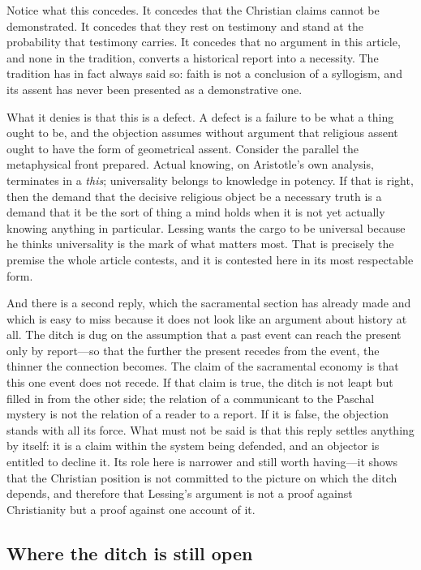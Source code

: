 Notice what this concedes. It concedes that the Christian claims cannot be demonstrated. It concedes that they rest on testimony and stand at the probability that testimony carries. It concedes that no argument in this article, and none in the tradition, converts a historical report into a necessity. The tradition has in fact always said so: faith is not a conclusion of a syllogism, and its assent has never been presented as a demonstrative one.

What it denies is that this is a defect. A defect is a failure to be what a thing ought to be, and the objection assumes without argument that religious assent ought to have the form of geometrical assent. Consider the parallel the metaphysical front prepared. Actual knowing, on Aristotle's own analysis, terminates in a \emph{this}; universality belongs to knowledge in potency. If that is right, then the demand that the decisive religious object be a necessary truth is a demand that it be the sort of thing a mind holds when it is not yet actually knowing anything in particular. Lessing wants the cargo to be universal because he thinks universality is the mark of what matters most. That is precisely the premise the whole article contests, and it is contested here in its most respectable form.

And there is a second reply, which the sacramental section has already made and which is easy to miss because it does not look like an argument about history at all. The ditch is dug on the assumption that a past event can reach the present only by report---so that the further the present recedes from the event, the thinner the connection becomes. The claim of the sacramental economy is that this one event does not recede. If that claim is true, the ditch is not leapt but filled in from the other side; the relation of a communicant to the Paschal mystery is not the relation of a reader to a report. If it is false, the objection stands with all its force. What must not be said is that this reply settles anything by itself: it is a claim within the system being defended, and an objector is entitled to decline it. Its role here is narrower and still worth having---it shows that the Christian position is not committed to the picture on which the ditch depends, and therefore that Lessing's argument is not a proof against Christianity but a proof against one account of it.

\subsection{Where the ditch is still open}

